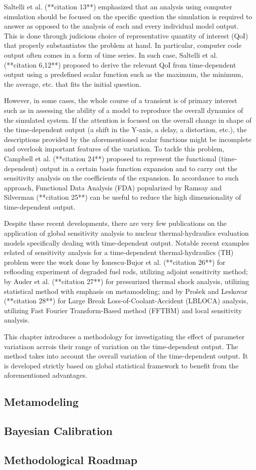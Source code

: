 Saltelli et al. (**citation 13**) emphasized that an analysis using computer simulation 
should be focused on the specific question the simulation is required to answer 
as opposed to the analysis of each and every individual model output. 
This is done through judicious choice of representative quantity of interest (QoI) 
that properly substantiates the problem at hand. 
In particular, computer code output often comes in a form of time series. 
In such case, Saltelli et al. (**citation 6,12**) proposed to derive the relevant QoI from time-dependent output 
using a predefined scalar function such as the maximum, the minimum, the average, etc. that fits the initial question.

However, in some cases, the whole course of a transient is of primary interest 
such as in assessing the ability of a model to reproduce the overall dynamics of the simulated system. 
If the attention is focused on the overall change in shape of the time-dependent output (a shift in the Y-axis, a delay, a distortion, etc.), 
the descriptions provided by the aforementioned scalar functions might be incomplete and overlook important features of the variation. 
To tackle this problem, Campbell et al. (**citation 24**) proposed to represent the functional (time-dependent) output in a certain basis function expansion 
and to carry out the sensitivity analysis on the coefficients of the expansion. 
In accordance to such approach, Functional Data Analysis (FDA) popularized by Ramsay and Silverman (**citation 25**) 
can be useful to reduce the high dimensionality of time-dependent output.

Despite these recent developments, 
there are very few publications on the application of global sensitivity analysis to nuclear thermal-hydraulics evaluation models specifically dealing with time-dependent output.
Notable recent examples related of sensitivity analysis for a time-dependent thermal-hydraulics (TH) problem were the work done by Ionescu-Bujor et al. (**citation 26**) 
for reflooding experiment of degraded fuel rods, utilizing adjoint sensitivity method; 
by Auder et al. (**citation 27**) for pressurized thermal shock analysis, 
utilizing statistical method with emphasis on metamodeling; 
and by Prošek and Leskovar (**citation 28**) for Large Break Loss-of-Coolant-Accident (LBLOCA) analysis, 
utilizing Fast Fourier Transform-Based method (FFTBM) and local sensitivity analysis.

This chapter introduces a methodology for investigating the effect of parameter variatiaon acrrois their range of variation on the time-dependent output.
The method takes into account the overall variation of the time-dependent output. 
It is developed strictly based on global statistical framework to benefit from the aforementioned advantages.


\subsection{Metamodeling}

\subsection{Bayesian Calibration}

\subsection{Methodological Roadmap}